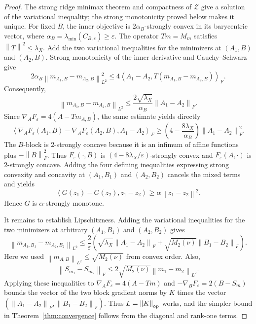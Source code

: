 \documentclass[11pt]{article}
\newcommand{\ip}[2]{\left\langle #1,#2\right\rangle}
\newcommand{\norm}[1]{\left\lVert #1\right\rVert}
\theoremstyle{plain}
\theoremstyle{definition}
\theoremstyle{remark}
\begin{document}
\begin{proof}
The strong ridge minimax theorem and compactness of $\mathcal Z$ give a
solution of the variational inequality; the strong monotonicity proved below makes it
unique.
For fixed \(B\), the inner objective is \(2\alpha_B\)-strongly convex in its
barycentric vector, where
\(\alpha_B=\lambda_{\min}(C_{B,\varepsilon})\ge\varepsilon\). The operator
\(Tm=M_m\) satisfies \(\norm{T}^2\le\lambda_X\). Add the two variational
inequalities for the minimizers at $(A_1,B)$ and $(A_2,B)$. Strong monotonicity
of the inner derivative and Cauchy--Schwarz give
\[
 2\alpha_B\norm{m_{A_1,B}-m_{A_2,B}}_{L^2}^2
 \le4\ip{A_1-A_2}{T(m_{A_1,B}-m_{A_2,B})}_F.
\]
Consequently,
\[
  \norm{m_{A_1,B}-m_{A_2,B}}_{L^2}
  \le\frac{2\sqrt{\lambda_X}}{\alpha_B}\norm{A_1-A_2}_F.
\]
Since $\nabla_AF_\varepsilon=4(A-Tm_{A,B})$, the same estimate yields directly
\[
 \ip{\nabla_AF_\varepsilon(A_1,B)-\nabla_AF_\varepsilon(A_2,B)}
 {A_1-A_2}_F
 \ge\left(4-\frac{8\lambda_X}{\alpha_B}\right)\norm{A_1-A_2}_F^2.
\]
The \(B\)-block is \(2\)-strongly
concave because it is an infimum of affine functions plus $-\norm{B}_F^2$.
Thus $F_\varepsilon(\cdot,B)$ is
$(4-8\lambda_X/\varepsilon)$-strongly convex and
$F_\varepsilon(A,\cdot)$ is $2$-strongly concave. Adding the four defining
inequalities expressing strong convexity and concavity at $(A_1,B_1)$ and
$(A_2,B_2)$ cancels
the mixed terms and yields
\[
 \ip{G(z_1)-G(z_2)}{z_1-z_2}
 \ge\alpha\norm{z_1-z_2}^2.
\]
Hence $G$ is $\alpha$-strongly monotone.

It remains to establish Lipschitzness. Adding the variational
inequalities for the two minimizers at arbitrary $(A_1,B_1)$ and $(A_2,B_2)$ gives
\[
 \norm{m_{A_1,B_1}-m_{A_2,B_2}}_{L^2}
 \le\frac2\varepsilon\left(
 \sqrt{\lambda_X}\norm{A_1-A_2}_F+
 \sqrt{M_2(\nu)}\norm{B_1-B_2}_F\right).
\]
Here we used $\norm{m_{A,B}}_{L^2}\le\sqrt{M_2(\nu)}$ from convex order.
Also,
\[
 \norm{S_{m_1}-S_{m_2}}_F
 \le2\sqrt{M_2(\nu)}\norm{m_1-m_2}_{L^2}.
\]
Applying these inequalities to
$\nabla_AF_\varepsilon=4(A-Tm)$ and
$-\nabla_BF_\varepsilon=2(B-S_m)$ bounds the vector of the two block gradient
norms by $K$ times the vector
$(\norm{A_1-A_2}_F,\norm{B_1-B_2}_F)$. Thus $L=\norm K_{\rm op}$ works, and
the simpler bound in Theorem~\ref{thm:convergence} follows from the diagonal
and rank-one terms.


\end{proof}
\end{document}
